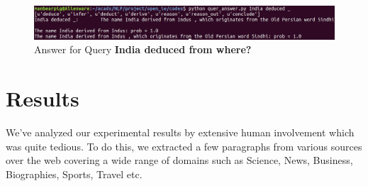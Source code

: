 \documentclass{article}
\begin{document}
\begin{figure}[H]
\centering
\includegraphics[width=1.0\textwidth]{query_syno.png}
\caption{Answer for Query \textbf{India deduced from where?}}
\label{fig:query_syno}
\end{figure}

\section{Results}
We've analyzed our experimental results by extensive human involvement which was quite tedious. To do this, we extracted a few paragraphs from various sources over the web covering a wide range of domains such as Science, News, Business, Biographies, Sports, Travel etc.
\end{document}
